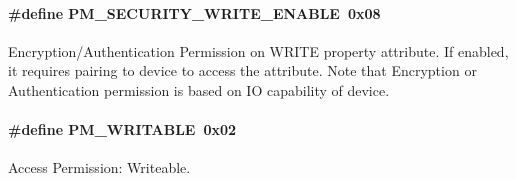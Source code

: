 \paragraph[{\texorpdfstring{P\+M\+\_\+\+S\+E\+C\+U\+R\+I\+T\+Y\+\_\+\+W\+R\+I\+T\+E\+\_\+\+E\+N\+A\+B\+LE}{PM_SECURITY_WRITE_ENABLE}}]{\setlength{\rightskip}{0pt plus 5cm}\#define P\+M\+\_\+\+S\+E\+C\+U\+R\+I\+T\+Y\+\_\+\+W\+R\+I\+T\+E\+\_\+\+E\+N\+A\+B\+LE~0x08}\hypertarget{group___b_l_e___g_a_t_t___a_t_t_r_i_b_u_t_e___p_e_r_m_i_s_s_i_o_n_s_ga0ae00cfc114463bef17cad9fd67bd912}{}\label{group___b_l_e___g_a_t_t___a_t_t_r_i_b_u_t_e___p_e_r_m_i_s_s_i_o_n_s_ga0ae00cfc114463bef17cad9fd67bd912}
Encryption/\+Authentication Permission on W\+R\+I\+TE property attribute. If enabled, it requires pairing to device to access the attribute. Note that Encryption or Authentication permission is based on IO capability of device. 
\paragraph[{\texorpdfstring{P\+M\+\_\+\+W\+R\+I\+T\+A\+B\+LE}{PM_WRITABLE}}]{\setlength{\rightskip}{0pt plus 5cm}\#define P\+M\+\_\+\+W\+R\+I\+T\+A\+B\+LE~0x02}\hypertarget{group___b_l_e___g_a_t_t___a_t_t_r_i_b_u_t_e___p_e_r_m_i_s_s_i_o_n_s_ga80efb1db8c2abd9e7f623354638d1599}{}\label{group___b_l_e___g_a_t_t___a_t_t_r_i_b_u_t_e___p_e_r_m_i_s_s_i_o_n_s_ga80efb1db8c2abd9e7f623354638d1599}
Access Permission\+: Writeable. 